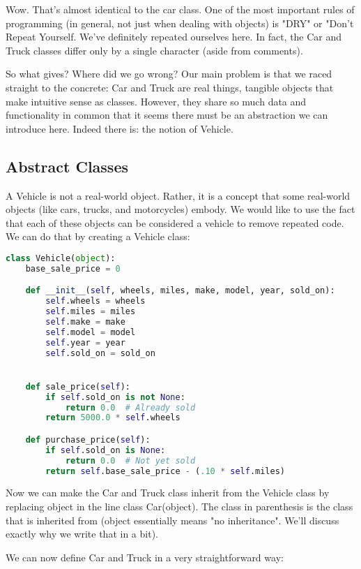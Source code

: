 Wow. That's almost identical to the car class. One of the most important rules of programming (in general, not just when dealing with objects) is "DRY" or "Don't Repeat Yourself. We've definitely repeated ourselves here. In fact, the Car and Truck classes differ only by a single character (aside from comments).

So what gives? Where did we go wrong? Our main problem is that we raced straight to the concrete: Car and Truck are real things, tangible objects that make intuitive sense as classes. However, they share so much data and functionality in common that it seems there must be an abstraction we can introduce here. Indeed there is: the notion of Vehicle.

\subsection{Abstract Classes}

A Vehicle is not a real-world object. Rather, it is a concept that some real-world objects (like cars, trucks, and motorcycles) embody. We would like to use the fact that each of these objects can be considered a vehicle to remove repeated code. We can do that by creating a Vehicle class:

\begin{lstlisting}[language=Python]
class Vehicle(object):
    base_sale_price = 0

    def __init__(self, wheels, miles, make, model, year, sold_on):
        self.wheels = wheels
        self.miles = miles
        self.make = make
        self.model = model
        self.year = year
        self.sold_on = sold_on


    def sale_price(self):
        if self.sold_on is not None:
            return 0.0  # Already sold
        return 5000.0 * self.wheels

    def purchase_price(self):
        if self.sold_on is None:
            return 0.0  # Not yet sold
        return self.base_sale_price - (.10 * self.miles)
\end{lstlisting}

Now we can make the Car and Truck class inherit from the Vehicle class by replacing object in the line class Car(object). The class in parenthesis is the class that is inherited from (object essentially means "no inheritance". We'll discuss exactly why we write that in a bit).

We can now define Car and Truck in a very straightforward way:


